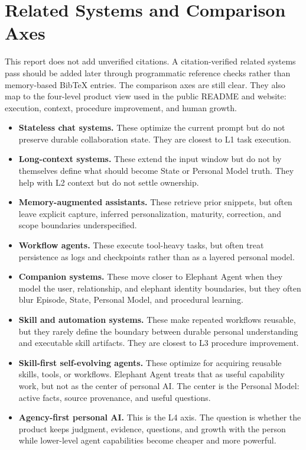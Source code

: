 \section{Related Systems and Comparison Axes}
\label{sec:related-systems}

This report does not add unverified citations. A citation-verified related
systems pass should be added later through programmatic reference checks rather
than memory-based BibTeX entries. The comparison axes are still clear. They
also map to the four-level product view used in the public README and website:
execution, context, procedure improvement, and human growth.

\begin{itemize}[leftmargin=*]
  \item \textbf{Stateless chat systems.} These optimize the current prompt but
  do not preserve durable collaboration state. They are closest to L1 task
  execution.

  \item \textbf{Long-context systems.} These extend the input window but do not
  by themselves define what should become State or Personal Model truth. They
  help with L2 context but do not settle ownership.

  \item \textbf{Memory-augmented assistants.} These retrieve prior snippets,
  but often leave explicit capture, inferred personalization, maturity,
  correction, and scope boundaries underspecified.

  \item \textbf{Workflow agents.} These execute tool-heavy tasks, but often
  treat persistence as logs and checkpoints rather than as a layered personal
  model.

  \item \textbf{Companion systems.} These move closer to Elephant Agent when they model
  the user, relationship, and elephant identity boundaries, but they often blur
  Episode, State, Personal Model, and procedural learning.

  \item \textbf{Skill and automation systems.} These make repeated workflows
  reusable, but they rarely define the boundary between durable personal
  understanding and executable skill artifacts. They are closest to L3
  procedure improvement.

  \item \textbf{Skill-first self-evolving agents.} These optimize for acquiring
  reusable skills, tools, or workflows. Elephant Agent treats that as useful capability
  work, but not as the center of personal AI. The center is the Personal Model:
  active facts, source provenance, and useful questions.

  \item \textbf{Agency-first personal AI.} This is the L4 axis. The question is
  whether the product keeps judgment, evidence, questions, and growth with the
  person while lower-level agent capabilities become cheaper and more powerful.
\end{itemize}

